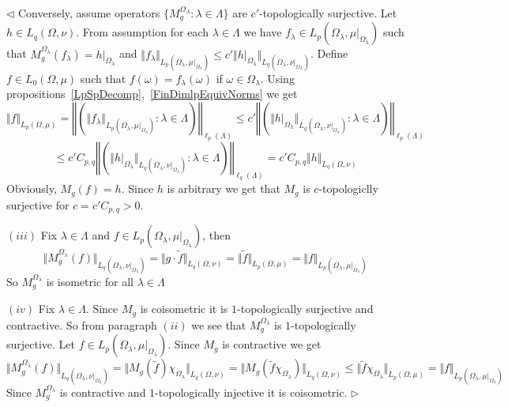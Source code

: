 \documentclass[12pt]{article}
\newenvironment{proof}{\par $\triangleleft$}{$\triangleright$}
\begin{document}
\begin{proof}
    Conversely, assume operators $ \{M_g^{\Omega_\Lambda}:\lambda\in\Lambda \}$
    are $c'$-topologically surjective. Let $h\in L_q(\Omega,\nu)$. From
    assumption for each $\lambda\in\Lambda$ we have $f_\lambda\in
        L_p(\Omega_\lambda,\mu|_{\Omega_\lambda})$ such that
    $M_g^{\Omega_\lambda}(f_\lambda)=h|_{\Omega_\lambda}$ and $\Vert
        f_\lambda\Vert_{L_p(\Omega_\lambda,\mu|_{\Omega_\lambda})}\leq c'\Vert
        h|_{\Omega_\lambda}\Vert_{L_q(\Omega_\lambda,\nu|_{\Omega_\lambda})}$.
    Define $f\in L_0(\Omega,\mu)$ such that $f(\omega)=f_\lambda(\omega)$ if
    $\omega\in\Omega_\lambda$.  Using
    propositions~\ref{LpSpDecomp},~\ref{FinDimlpEquivNorms} we get
    $$
        \Vert f\Vert_{L_p(\Omega,\mu)}
        =\left\Vert
        \left(
        \Vert f_\lambda\Vert_{
        L_p(\Omega_\lambda,\mu|_{\Omega_\lambda})
        }:\lambda\in\Lambda
        \right)\right\Vert_{\ell_p(\Lambda)}
        \leq c'\left\Vert\left(\Vert h|_{\Omega_\lambda}\Vert_{
        L_q(\Omega_\lambda,\nu|_{\Omega_\lambda})}
        :\lambda\in\Lambda\right)\right\Vert_{\ell_p(\Lambda)}
    $$
    $$
        \leq c'C_{p,q}\left\Vert\left(
        \Vert h|_{\Omega_\lambda}\Vert_{
        L_q(\Omega_\lambda,\nu|_{\Omega_\lambda})
        }:\lambda\in\Lambda
        \right)\right\Vert_{\ell_q(\Lambda)}
        =c'C_{p,q}\Vert h\Vert_{L_q(\Omega,\nu)}
    $$
    Obviously, $M_g(f)=h$. Since $h$ is arbitrary we get that $M_g$ is
    $c$-topologiclly surjective for $c=c'C_{p,q}>0$.

    $(iii)$ Fix $\lambda\in\Lambda$ and $f\in
        L_p(\Omega_\lambda,\mu|_{\Omega_\lambda})$, then
    $$
        \Vert M_g^{\Omega_\lambda}(f)\Vert_{
        L_q(\Omega_\lambda,\nu|_{\Omega_\lambda})}
        =\Vert g\cdot \widetilde{f}\Vert_{L_q(\Omega,\nu)}
        =\Vert\widetilde{f}\Vert_{L_p(\Omega,\mu)}
        =\Vert f\Vert_{L_p(\Omega_\lambda,\mu|_{\Omega_\lambda})}
    $$
    So $M_g^{\Omega_\lambda}$ is isometric for all $\lambda\in\Lambda$

    $(iv)$ Fix $\lambda\in\Lambda$. Since $M_g$ is coisometric it is
    $1$-topologically surjective and contractive. So from paragraph $(ii)$ we
    see that $M_g^{\Omega_\lambda}$ is $1$-topologically surjective. 
    Let $f\in L_p(\Omega_\lambda,\mu|_{\Omega_\lambda})$. 
    Since $M_g$ is contractive we get
    $$
        \Vert M_g^{\Omega_\lambda}(f)\Vert_{
        L_q(\Omega_\lambda,\nu|_{\Omega_\lambda})}
        =\Vert M_g(\widetilde{f})\chi_{\Omega_\lambda}\Vert_{L_q(\Omega,\nu)}
        =\Vert M_g(\widetilde{f}\chi_{\Omega_\lambda})\Vert_{L_q(\Omega,\nu)}
        \leq \Vert\widetilde{f}\chi_{\Omega_\lambda}\Vert_{L_p(\Omega,\mu)}
        =\Vert f\Vert_{L_p(\Omega_{\lambda},\mu|_{\Omega_\lambda})}
    $$
    Since $M_g^{\Omega_\lambda}$ is contractive and $1$-topologically injective
    it is coisometric.
\end{proof}
\end{document}
